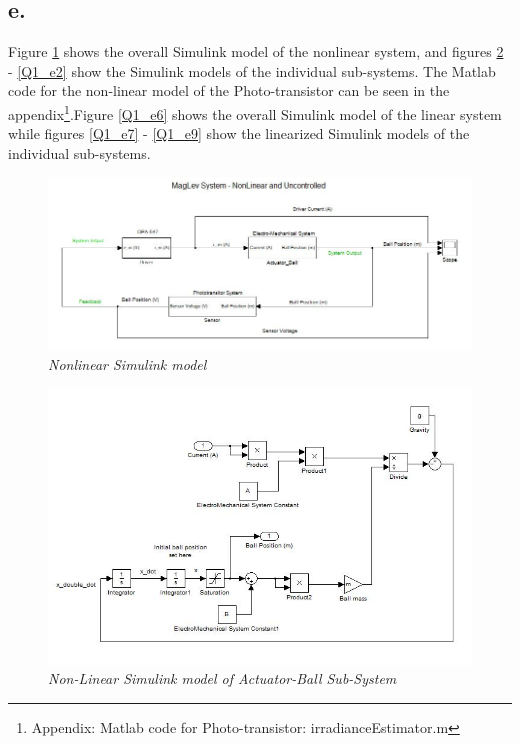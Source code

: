 \documentclass{article}
\theoremstyle{plain}
\theoremstyle{definition}
\theoremstyle{remark}
\begin{document}
\subsection*{e.}
Figure \ref{Q1_e1}  shows the overall Simulink model of the nonlinear system, and figures \ref{Q1_e4} - \ref{Q1_e2} show the Simulink models of the individual sub-systems. The Matlab code for the non-linear model of the Photo-transistor can be seen in the appendix\footnote{Appendix: Matlab code for Photo-transistor: irradianceEstimator.m }.Figure \ref{Q1_e6}  shows the overall Simulink model of the linear system while figures \ref{Q1_e7} - \ref{Q1_e9} show the linearized Simulink models of the individual sub-systems.\\
\begin{figure}
\begin{center}
\includegraphics[width = 15cm]{NonLinearUnControlledComplete}
\caption{\emph{Nonlinear Simulink model}}
\label{Q1_e1}
\end{center}
\end{figure}

\begin{figure}
\begin{center}
\includegraphics[width = 15cm]{NonLinearUnControlledActuatorBall}
\caption{\emph{Non-Linear Simulink model of Actuator-Ball Sub-System}}
\label{Q1_e4}
\end{center}
\end{figure}
\end{document}
